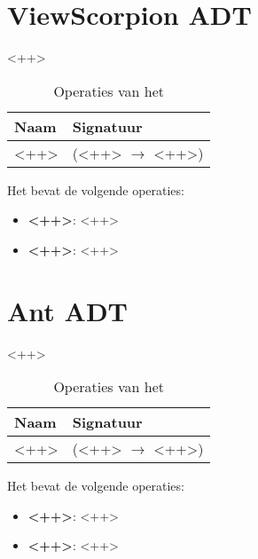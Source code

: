 \section{View\textunderscore Scorpion ADT}
\label{section:view_scorpion}

<++>

\begin{table}[hbt]
\centering
\begin{tabular}{|ll|}
\hline
\rowcolor[HTML]{000000} 
{\color[HTML]{FFFFFF} \textbf{Naam}} & {\color[HTML]{FFFFFF} \textbf{Signatuur}} \\ \hline
<++>                                 & (<++> $\rightarrow$ <++>)                                       \\ \hline
\end{tabular}
\caption{Operaties van het \texttt{}}
\label{table:view_scorpion}
\end{table}

Het \texttt{} bevat de volgende operaties:

\begin{itemize}
	\item \textbf{<++>}: <++>
	\item \textbf{<++>}: <++>
\end{itemize}

\section{Ant ADT}
\label{section:ant}

<++>

\begin{table}[hbt]
\centering
\begin{tabular}{|ll|}
\hline
\rowcolor[HTML]{000000} 
{\color[HTML]{FFFFFF} \textbf{Naam}} & {\color[HTML]{FFFFFF} \textbf{Signatuur}} \\ \hline
<++>                                 & (<++> $\rightarrow$ <++>)                                       \\ \hline
\end{tabular}
\caption{Operaties van het \texttt{}}
\label{table:ant}
\end{table}

Het \texttt{} bevat de volgende operaties:

\begin{itemize}
	\item \textbf{<++>}: <++>
	\item \textbf{<++>}: <++>
\end{itemize}

